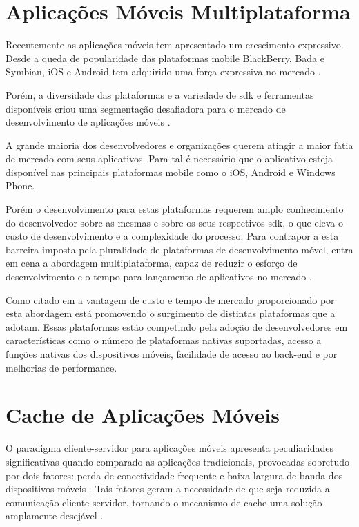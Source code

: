 \documentclass[
	article,			%
	11pt,				%
	oneside,			%
	a4paper,			%
	english,			%
	brazil,				%
	sumario=tradicional
]{abntex2}
\begin{document}
\section{Aplicações Móveis Multiplataforma}
Recentemente as aplicações móveis tem apresentado um crescimento expressivo. Desde a queda de popularidade das plataformas mobile BlackBerry, Bada e Symbian, iOS e Android tem adquirido uma força expressiva no mercado \cite{dalmasso2013survey}.

Porém, a diversidade das plataformas e a variedade de \gls{sdk} e ferramentas disponíveis criou uma segmentação desafiadora para o mercado de desenvolvimento de aplicações móveis \cite{dalmasso2013survey}.

A grande maioria dos desenvolvedores e organizações querem atingir a maior fatia de mercado com seus aplicativos. Para tal é necessário que o aplicativo esteja disponível nas principais plataformas mobile como o iOS, Android e Windows Phone. 

Porém o desenvolvimento para estas plataformas requerem amplo conhecimento do desenvolvedor sobre as mesmas e sobre os seus respectivos \gls{sdk}, o que eleva o custo de desenvolvimento e a complexidade do processo. Para contrapor a esta barreira imposta pela pluralidade de plataformas de desenvolvimento móvel, entra em cena a abordagem multiplataforma, capaz de reduzir o esforço de desenvolvimento e o tempo para lançamento de aplicativos no mercado \cite{dalmasso2013survey}.

Como citado em \cite{shehab2014reducing} a vantagem de custo e tempo de mercado proporcionado por esta abordagem está promovendo o surgimento de distintas plataformas que a adotam. Essas plataformas estão competindo pela adoção de desenvolvedores em características como o número de plataformas nativas suportadas, acesso a funções nativas dos dispositivos móveis, facilidade de acesso ao \gls{back-end} e por melhorias de performance. 

\section{Cache de Aplicações Móveis}

O paradigma cliente-servidor para aplicações móveis apresenta peculiaridades significativas quando comparado as aplicações tradicionais, provocadas sobretudo por dois fatores: perda de conectividade frequente e baixa largura de banda dos dispositivos móveis \cite{rathore2007overview}.
Tais fatores geram a necessidade de que seja reduzida a comunicação cliente servidor, tornando o mecanismo de cache uma solução amplamente desejável \cite{rathore2007overview}.
\end{document}
